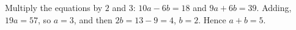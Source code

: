 Multiply the equations by $2$ and $3$: $10a-6b=18$ and $9a+6b=39$. Adding, $19a=57$, so $a=3$, and then $2b=13-9=4$, $b=2$. Hence $a+b=\boxed{5}$.
